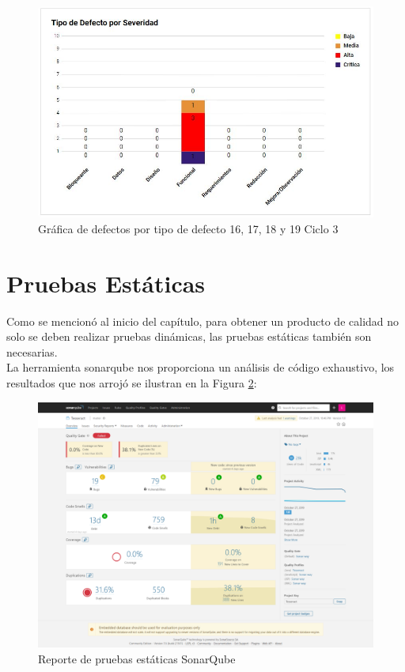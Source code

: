 \begin{figure}[H]
	\begin{center}
		\includegraphics[width=.65\textwidth]{images/pruebas/s16c3-2}
		\caption{Gráfica de defectos por tipo de defecto 16, 17, 18 y 19  Ciclo 3}
		\label{fig:infos16c3-2}
	\end{center}
\end{figure}


\newpage

\section{Pruebas Estáticas}
Como se mencionó al inicio del capítulo, para obtener un producto de calidad no solo se deben realizar pruebas dinámicas, las pruebas estáticas también son necesarias.\\ La herramienta sonarqube nos proporciona un análisis de código exhaustivo, los resultados que nos arrojó se ilustran en la Figura \ref{fig:infoesta}: \\

\begin{figure}[H]
	\begin{center}
		\includegraphics[width=.99\textwidth]{images/pruebas/estaticas/TesseractSonarFirstQualityTest}
		\caption{Reporte de pruebas estáticas SonarQube}
		\label{fig:infoesta}
	\end{center}
\end{figure}

